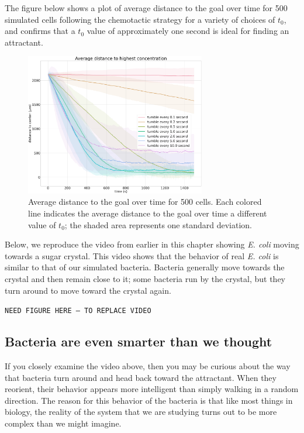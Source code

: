 The figure below shows a plot of average distance to the goal over time for 500 simulated cells following the chemotactic strategy for a variety of choices of $t_0$, and confirms that a $t_0$ value of approximately one second is ideal for finding an attractant.


\begin{figure}[h]
\centering
\mySfFamily
\includegraphics[width = 0.7\textwidth]{../images/chemotaxis_performance_uniform.png}
\caption{Average distance to the goal over time for 500 cells. Each colored line indicates the average distance to the goal over time a different value of $t_0$; the shaded area represents one standard deviation.}
\label{fig:chemotaxis_performance_uniform}
\end{figure}


Below, we reproduce the video from earlier in this chapter showing \textit{E. coli} moving towards a sugar crystal. This video shows that the behavior of real \textit{E. coli} is similar to that of our simulated bacteria. Bacteria generally move towards the crystal and then remain close to it; some bacteria run by the crystal, but they turn around to move toward the crystal again.

\texttt{NEED FIGURE HERE -- TO REPLACE VIDEO}\\


\FloatBarrier
{}
{}
\subsection{Bacteria are even smarter than we thought}

If you closely examine the video above, then you may be curious about the way that bacteria turn around and head back toward the attractant. When they reorient, their behavior appears more intelligent than simply walking in a random direction. The reason for this behavior of the bacteria is that like most things in biology, the reality of the system that we are studying turns out to be more complex than we might imagine.

